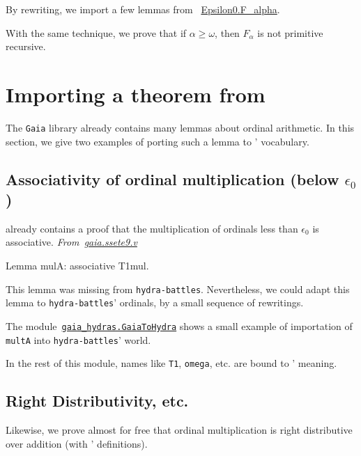 By rewriting, we import a few lemmas from
~\href{../theories/html/hydras.Epsilon0.F_alpha.html}{Epsilon0.F\_alpha}.




With the same technique, we prove that if
$\alpha\geq\omega$, then $F_\alpha$ is not primitive recursive.




\section{Importing a theorem from \gaia}
\label{sect:gaia2hydra}

The \texttt{Gaia} library already contains many lemmas about
ordinal arithmetic. In this section, we give two examples of
porting such a lemma to \HydrasLib' vocabulary.

\subsection{Associativity of ordinal multiplication (below \texorpdfstring{$\epsilon_0$}{epsilon\_0})}
\gaia already contains a proof that the multiplication of ordinals less than $\epsilon_0$ is associative.
\emph{From~\href{https://github.com/coq-community/gaia/blob/master/theories/ssete9.v}{gaia.ssete9.v}}

\begin{Coqsrc}
Lemma mulA: associative T1mul.
\end{Coqsrc}

This lemma was missing from \texttt{hydra-battles}. Nevertheless, we could adapt this lemma to \texttt{hydra-battles}' ordinals, by a small sequence of rewritings.


The module~\href{../theories/html/gaia_hydras.GaiaToHydra.html}%
{\texttt{gaia\_hydras.GaiaToHydra}} shows a small
example of importation of \texttt{multA} into \texttt{hydra-battles}' world.


In the rest of this module, names like  \texttt{T1}, \texttt{omega}, etc. are  bound to \HydrasLib' meaning.


 \subsection{Right Distributivity, etc.}
 Likewise, we prove almost for free that ordinal multiplication is right distributive over addition (with \HydrasLib' definitions).

